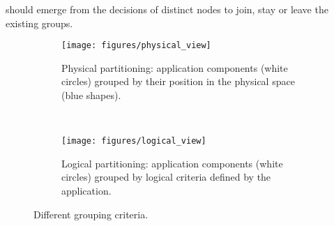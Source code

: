 should emerge from the decisions of distinct nodes to join, stay or leave the existing groups.











\begin{figure*}[t!]
    \centering
    \begin{subfigure}[b]{0.4\textwidth}
        \centering
        \texttt{[image: figures/physical\_view]}
        \caption{Physical partitioning: application components (white circles) grouped by their position in the physical space (blue shapes).}
    \end{subfigure}%
    ~ 
    \begin{subfigure}[b]{0.4\textwidth}
        \centering
        \texttt{[image: figures/logical\_view]}
        \caption{Logical partitioning: application components (white circles) grouped by logical criteria defined by the application.}
    \end{subfigure}
    \caption{Different grouping criteria.}
    \label{fig:motivation}
\end{figure*}




